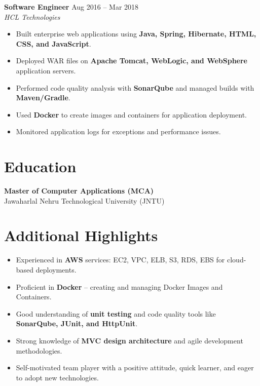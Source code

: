 \documentclass[9.5pt, letterpaper]{article}
\begin{document}
\vspace{2pt}

\textbf{Software Engineer} \hfill Aug 2016 -- Mar 2018 \\
\textit{HCL Technologies}
\begin{itemize}
    \item Built enterprise web applications using \textbf{Java, Spring, Hibernate, HTML, CSS, and JavaScript}.
    \item Deployed WAR files on \textbf{Apache Tomcat, WebLogic, and WebSphere} application servers.
    \item Performed code quality analysis with \textbf{SonarQube} and managed builds with \textbf{Maven/Gradle}.
    \item Used \textbf{Docker} to create images and containers for application deployment.
    \item Monitored application logs for exceptions and performance issues.
\end{itemize}

\section{Education}

\textbf{Master of Computer Applications (MCA)} \\
Jawaharlal Nehru Technological University (JNTU)

\section{Additional Highlights}

\begin{itemize}
    \item Experienced in \textbf{AWS} services: EC2, VPC, ELB, S3, RDS, EBS for cloud-based deployments.
    \item Proficient in \textbf{Docker} -- creating and managing Docker Images and Containers.
    \item Good understanding of \textbf{unit testing} and code quality tools like \textbf{SonarQube, JUnit, and HttpUnit}.
    \item Strong knowledge of \textbf{MVC design architecture} and agile development methodologies.
    \item Self-motivated team player with a positive attitude, quick learner, and eager to adopt new technologies.
\end{itemize}
\end{document}
